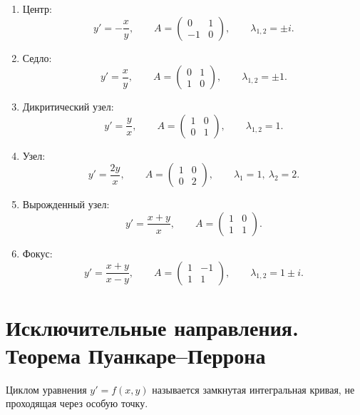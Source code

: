 \documentclass[12pt,a4paper]{article}
\numberwithin{equation}{section}
\begin{document}
\begin{exampleHSE}
\begin{enumerate}
  \item Центр:
  \[
y'=-\frac{x}{y},\qquad
A=\begin{pmatrix}0&1\\-1&0\end{pmatrix},
\qquad \lambda_{1,2}=\pm i.
  \]
  \item Седло:
  \[
y'=\frac{x}{y},\qquad
A=\begin{pmatrix}0&1\\1&0\end{pmatrix},
\qquad \lambda_{1,2}=\pm1.
  \]
  \item Дикритический узел:
  \[
y'=\frac{y}{x},\qquad
A=\begin{pmatrix}1&0\\0&1\end{pmatrix},
\qquad \lambda_{1,2}=1.
  \]
  \item Узел:
  \[
y'=\frac{2y}{x},\qquad
A=\begin{pmatrix}1&0\\0&2\end{pmatrix},
\qquad \lambda_1=1,\ \lambda_2=2.
  \]
  \item Вырожденный узел:
  \[
y'=\frac{x+y}{x},\qquad
A=\begin{pmatrix}1&0\\1&1\end{pmatrix}.
  \]
  \item Фокус:
  \[
y'=\frac{x+y}{x-y},\qquad
A=\begin{pmatrix}1&-1\\1&1\end{pmatrix},
\qquad \lambda_{1,2}=1\pm i.
  \]
\end{enumerate}

\end{exampleHSE}

\section[Пуанкаре--Перрон]{Исключительные направления. Теорема Пуанкаре--Перрона}

\begin{definitionHSE}[Цикл]
Циклом уравнения $y'=f(x,y)$ называется замкнутая интегральная кривая, не проходящая через особую точку.
\end{definitionHSE}
\end{document}
